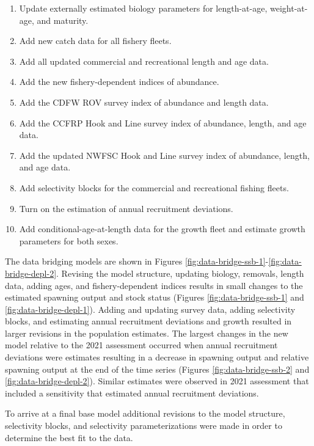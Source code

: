 \documentclass[11pt,
  english,
  letterpaper,
]{article}
\providecommand{\tightlist}{%
  \setlength{\itemsep}{0pt}\setlength{\parskip}{0pt}}
\providecommand{\tightlist}{%
  \setlength{\itemsep}{0pt}\setlength{\parskip}{0pt}}
\begin{document}
\begin{enumerate}
\def\labelenumi{\arabic{enumi}.}
\tightlist
\item
  Update externally estimated biology parameters for length-at-age, weight-at-age, and maturity.
\item
  Add new catch data for all fishery fleets.
\item
  Add all updated commercial and recreational length and age data.
\item
  Add the new fishery-dependent indices of abundance.
\item
  Add the CDFW ROV survey index of abundance and length data.
\item
  Add the CCFRP Hook and Line survey index of abundance, length, and age data.
\item
  Add the updated NWFSC Hook and Line survey index of abundance, length, and age data.
\item
  Add selectivity blocks for the commercial and recreational fishing fleets.
\item
  Turn on the estimation of annual recruitment deviations.
\item
  Add conditional-age-at-length data for the growth fleet and estimate growth parameters for both sexes.
\end{enumerate}

The data bridging models are shown in Figures \ref{fig:data-bridge-ssb-1}-\ref{fig:data-bridge-depl-2}. Revising the model structure, updating biology, removals, length data, adding ages, and fishery-dependent indices results in small changes to the estimated spawning output and stock status (Figures \ref{fig:data-bridge-ssb-1} and \ref{fig:data-bridge-depl-1}). Adding and updating survey data, adding selectivity blocks, and estimating annual recruitment deviations and growth resulted in larger revisions in the population estimates. The largest changes in the new model relative to the 2021 assessment occurred when annual recruitment deviations were estimates resulting in a decrease in spawning output and relative spawning output at the end of the time series (Figures \ref{fig:data-bridge-ssb-2} and \ref{fig:data-bridge-depl-2}). Similar estimates were observed in 2021 assessment that included a sensitivity that estimated annual recruitment deviations.

To arrive at a final base model additional revisions to the model structure, selectivity blocks, and selectivity parameterizations were made in order to determine the best fit to the data.
\end{document}
